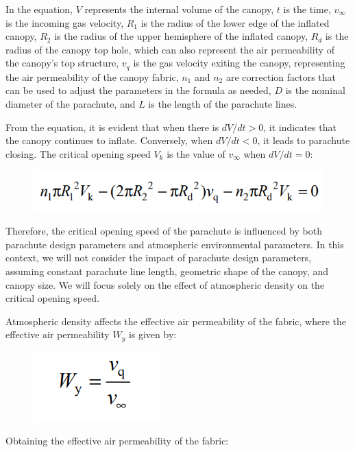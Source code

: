 \documentclass[12pt]{article}
\begin{document}
In the equation, \(V\) represents the internal volume of the canopy, \(t\) is the time, \(v_\infty \) is the incoming gas 
velocity, \(R_1\) is the radius of the lower edge of the inflated canopy, \(R_2\) is the radius of the upper hemisphere 
of the inflated canopy, \(R_d\) is the radius of the canopy top hole, which can also represent the air permeability 
of the canopy's top structure, \(v_q\) is the gas velocity exiting the canopy, representing the air permeability of 
the canopy fabric, \(n_1\) and \(n_2\) are correction factors that can be used to adjust the parameters in the formula 
as needed, \(D\) is the nominal diameter of the parachute, and \(L\) is the length of the parachute lines.

From the equation, it is evident that when there is \(dV/dt > 0\), it indicates that the canopy continues to inflate. 
Conversely, when \(dV/dt < 0\), it leads to parachute closing. The critical opening speed \(V_k\) is the value of \(v_\infty \) 
when \(dV/dt = 0\):

\begin{figure}[!hbtp]
    \centering 
    \includegraphics[width = 0.8\linewidth]{image/016.png}
\end{figure}

Therefore, the critical opening speed of the parachute is influenced by both parachute 
design parameters and atmospheric environmental parameters. In this context, we will not 
consider the impact of parachute design parameters, assuming constant parachute line length, 
geometric shape of the canopy, and canopy size. We will focus solely on the effect of atmospheric 
density on the critical opening speed.

Atmospheric density affects the effective air permeability of the fabric, where the effective air permeability \(W_y\) is given by:

\begin{figure}[!hbtp]
    \centering 
    \includegraphics[width = 0.2\linewidth]{image/017.png}
\end{figure}

\newpage
Obtaining the effective air permeability of the fabric:
\end{document}
